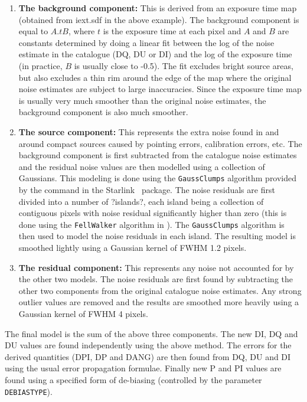 \begin{enumerate}
\item {\bf The background component:} This is derived from an exposure time map  (obtained from
iext.sdf in the above example). The background component is equal to $A.tB$, where $t$ is 
the exposure time at each pixel and $A$ and $B$ are constants determined by doing a linear fit 
between
the log of the noise estimate in the catalogue (DQ, DU or DI) and the log of the exposure time
(in practice, $B$ is usually close to -0.5). The fit excludes bright source areas, but also excludes a
thin rim around the edge of the map where the original noise estimates are subject to large
inaccuracies. Since the exposure time map is usually very much smoother than the original
noise estimates, the background component is also much smoother.
\item {\bf The source component:} This represents the extra noise found in and around compact sources caused by pointing errors, calibration errors, etc. The background component is first subtracted from the catalogue noise estimates and the residual noise values are then modelled using a collection of Gaussians. This modeling is done using the \texttt{GaussClumps} algorithm provided by the  command in the Starlink \cupid\ package. The noise residuals are first divided into a number of ?islands?, each island being a collection of contiguous pixels with  noise residual significantly higher than zero (this is done using the \texttt{FellWalker} algorithm in \cupid). The \texttt{GaussClumps} algorithm is then used to model the noise residuals in each island. The resulting model is smoothed lightly using a Gaussian kernel of FWHM 1.2 pixels.
\item {\bf The residual component:} This represents any noise not accounted for by the other two models. The noise residuals are first found by subtracting the other two components from the original catalogue noise estimates. Any strong outlier values are removed and the results are smoothed more heavily using a Gaussian kernel of FWHM 4 pixels.
\end{enumerate}

The final model is the sum of the above three components. The new DI, DQ and DU values are found independently using the above method. The errors for the derived quantities (DPI, DP and DANG) are then found from DQ, DU and DI using the usual error propagation formulae. Finally new P and PI values are found using a specified form of de-biasing (controlled by the parameter \texttt{DEBIASTYPE}).


